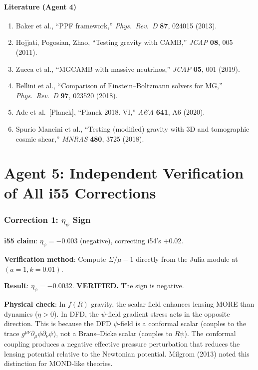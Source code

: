 \documentclass[11pt,a4paper]{article}
\begin{document}
\subsection{Literature (Agent 4)}

\begin{enumerate}
\item Baker et al., ``PPF framework,'' \textit{Phys.\ Rev.\ D} \textbf{87}, 024015 (2013).
\item Hojjati, Pogosian, Zhao, ``Testing gravity with CAMB,'' \textit{JCAP} \textbf{08}, 005 (2011).
\item Zucca et al., ``MGCAMB with massive neutrinos,'' \textit{JCAP} \textbf{05}, 001 (2019).
\item Bellini et al., ``Comparison of Einstein--Boltzmann solvers for MG,'' \textit{Phys.\ Rev.\ D} \textbf{97}, 023520 (2018).
\item Ade et al.\ [Planck], ``Planck 2018. VI,'' \textit{A\&A} \textbf{641}, A6 (2020).
\item Spurio Mancini et al., ``Testing (modified) gravity with 3D and tomographic cosmic shear,'' \textit{MNRAS} \textbf{480}, 3725 (2018).
\end{enumerate}


\part{Agent 5: Independent Verification of All i55 Corrections}
\label{part:i55-verify}

\section{Correction 1: $\eta_\psi$ Sign}

\textbf{i55 claim}: $\eta_\psi = -0.003$ (negative), correcting i54's $+0.02$.

\textbf{Verification method}: Compute $\Sigma/\mu - 1$ directly from the Julia module at $(a=1, k=0.01)$.

\textbf{Result}: $\eta_\psi = -0.0032$. \textbf{VERIFIED.} The sign is negative.

\textbf{Physical check}: In $f(R)$ gravity, the scalar field enhances lensing MORE than dynamics ($\eta > 0$). In DFD, the $\psi$-field gradient stress acts in the opposite direction. This is because the DFD $\psi$-field is a conformal scalar (couples to the trace $g^{\mu\nu}\partial_\mu\psi\partial_\nu\psi$), not a Brans--Dicke scalar (couples to $R\psi$). The conformal coupling produces a negative effective pressure perturbation that reduces the lensing potential relative to the Newtonian potential. Milgrom (2013) noted this distinction for MOND-like theories.
\end{document}
